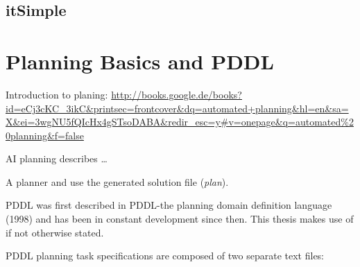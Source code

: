 \documentclass[11pt]{report}
\begin{document}
\section{itSimple}
\label{sec-2-4}
\chapter{Planning Basics and PDDL}
\label{sec-3}
\begin{center}
\end{center}


Introduction to planing:
\url{http://books.google.de/books?id=eCj3cKC_3ikC&printsec=frontcover&dq=automated+planning&hl=en&sa=X&ei=3wgNU5fQIcHx4gSTsoDABA&redir_esc=y#v=onepage&q=automated%20planning&f=false}

AI planning describes \ldots{}

A planner and use the generated solution file (\emph{plan}).

PDDL was first described in PDDL-the planning domain definition
language (1998) and has been in constant development since then.
This thesis makes use of \textcite{pddl3.1} if not otherwise stated. 

PDDL planning task specifications are composed of two separate text files:
\end{document}
